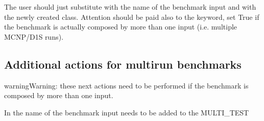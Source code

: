 \documentclass[letterpaper,10pt,english]{sphinxmanual}
\begin{document}
\begin{sphinxVerbatim}[commandchars=\\\{\}]

   
       
             
       
         

\end{sphinxVerbatim}

\sphinxAtStartPar
The user should just substitute  with the name of the benchmark input and  with
the newly created class. Attention should be paid also to the  keyword, set True if
the benchmark is actually composed by more than one input (i.e. multiple MCNP/D1S runs).


\subsection{Additional actions for multi\sphinxhyphen{}run benchmarks}
\label{\detokenize{dev/insertbenchmarks:additional-actions-for-multi-run-benchmarks}}
\begin{sphinxadmonition}{warning}{Warning:}
\sphinxAtStartPar
these next actions need to be performed  if the benchmark is composed by more than one input.
\end{sphinxadmonition}

\sphinxAtStartPar
In  the name of the benchmark input needs to be added to the MULTI\_TEST

\begin{sphinxVerbatim}[commandchars=\\\{\}]
  \PYG{p}{[}   \PYG{p}{]}
\end{sphinxVerbatim}
\end{document}
